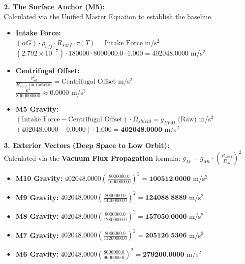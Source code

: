\documentclass[11pt, a4paper]{article}
\begin{document}
  \vspace{1.0em}
  \noindent \textbf{2. The Surface Anchor (M5):} \\
  \hspace*{1em} Calculated via the Unified Master Equation to establish the baseline.
  \begin{itemize}
    \item \textbf{Intake Force:} \\[0.5em]
    \hspace*{2em} $(\alpha G) \cdot \rho_{eff} \cdot R_{surf} \cdot \tau(T) = \text{Intake Force}$ m/s$^2$ \\[1em]
    \hspace*{2em} $(2.792 \times 10^{-7}) \cdot 180000 \cdot 8000000.0 \cdot 1.000 = 402048.0000$ m/s$^2$
    
    \item \textbf{Centrifugal Offset:} \\[0.5em]
    \hspace*{2em} $\frac{v_{rot}^2}{R_{surf} \text{ (in meters)}} = \text{Centrifugal Offset}$ m/s$^2$ \\[1em]
    \hspace*{2em} $\frac{0^2}{8000000000} \approx 0.0000$ m/s$^2$
    
    \item \textbf{M5 Gravity:} \\[0.5em]
    \hspace*{2em} $(\text{Intake Force} - \text{Centrifugal Offset}) \cdot \Omega_{shield} = g_{EFM} \text{ (Raw)}$ m/s$^2$ \\[1em]
    \hspace*{2em} $(402048.0000 - 0.0000) \cdot 1.000 = \textbf{402048.0000}$ m/s$^2$
  \end{itemize}

  \clearpage
  \noindent \textbf{3. Exterior Vectors (Deep Space to Low Orbit):} \\
  \hspace*{1em} Calculated via the \textbf{Vacuum Flux Propagation} formula: $g_M = g_{M5} \cdot \left( \frac{R_{surf}}{R_M} \right)^2$
  \begin{itemize}
    \item \textbf{M10 Gravity:} $402048.0000 \left( \frac{8000000.0}{16000000.0} \right)^2 = \textbf{100512.0000}$ m/s$^2$
    \item \textbf{M9 Gravity:} $402048.0000 \left( \frac{8000000.0}{14400000.0} \right)^2 = \textbf{124088.8889}$ m/s$^2$
    \item \textbf{M8 Gravity:} $402048.0000 \left( \frac{8000000.0}{12800000.0} \right)^2 = \textbf{157050.0000}$ m/s$^2$
    \item \textbf{M7 Gravity:} $402048.0000 \left( \frac{8000000.0}{11200000.0} \right)^2 = \textbf{205126.5306}$ m/s$^2$
    \item \textbf{M6 Gravity:} $402048.0000 \left( \frac{8000000.0}{9600000.0} \right)^2 = \textbf{279200.0000}$ m/s$^2$
  \end{itemize}
\end{document}
